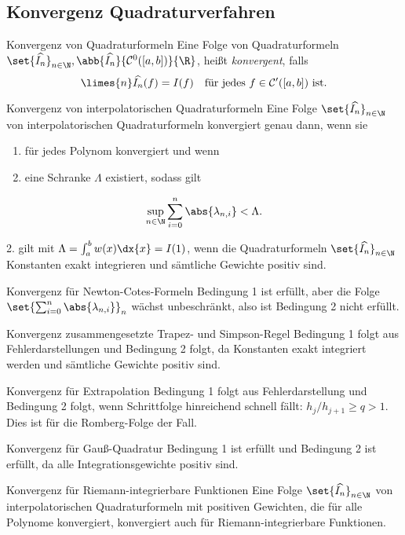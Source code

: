 \subsection*{Konvergenz Quadraturverfahren}

\begin{karte}{Konvergenz von Quadraturformeln}
    Eine Folge von Quadraturformeln \( \set{\widehat{I_n}}_{n\in\N}, \abb{\widehat{I_n}}{\mathcal{C}^0([a,b])}{\R} \), 
    heißt \textit{konvergent}, falls 
    \[ \limes{n} \widehat{I_n}(f) = I(f) \quad \text{für jedes } f \in \mathcal{C^0}([a,b]) \text{ ist}. \]
\end{karte}

\begin{karte}{Konvergenz von interpolatorischen Quadraturformeln}
    Eine Folge \( \set{\widehat{I_n}}_{n\in\N} \) von interpolatorischen Quadraturformeln 
    konvergiert genau dann, wenn sie 
    \begin{enumerate}
        \item für jedes Polynom konvergiert und wenn
        \item eine Schranke \(\Lambda\) existiert, sodass gilt 
    \end{enumerate}
    \[ \sup_{n\in\N} \sum_{i=0}^n \abs{\lambda_{n,i}} < \Lambda. \]

    2. gilt mit \( \Lambda = \int_a^b w(x) \dx{x} = I(1) \), wenn die Quadraturformeln \( \set{\widehat{I_n}}_{n\in\N} \) 
    Konstanten exakt integrieren und sämtliche Gewichte positiv sind.
\end{karte}

\begin{karte}{Konvergenz für Newton-Cotes-Formeln}
    Bedingung 1 ist erfüllt, aber die Folge \( \set{ \sum_{i=0}^n \abs{\lambda_{n,i}} }_n \) 
    wächst unbeschränkt, also ist Bedingung 2 nicht erfüllt.
\end{karte}

\begin{karte}{Konvergenz zusammengesetzte Trapez- und Simpson-Regel}
    Bedingung 1 folgt aus Fehlerdarstellungen und Bedingung 2 folgt, da Konstanten exakt 
    integriert werden und sämtliche Gewichte positiv sind.
\end{karte}

\begin{karte}{Konvergenz für Extrapolation}
    Bedingung 1 folgt aus Fehlerdarstellung und Bedingung 2 folgt, wenn Schrittfolge hinreichend schnell 
    fällt: \( h_j/h_{j+1} \geq q > 1 \). Dies ist für die Romberg-Folge der Fall.
\end{karte}

\begin{karte}{Konvergenz für Gauß-Quadratur}
    Bedingung 1 ist erfüllt und Bedingung 2 ist erfüllt, da alle Integrationsgewichte positiv sind.
\end{karte}

\begin{karte}{Konvergenz für Riemann-integrierbare Funktionen}
    Eine Folge \( \set{\widehat{I_n}}_{n\in\N} \) von interpolatorischen Quadraturformeln mit positiven 
    Gewichten, die für alle Polynome konvergiert, konvergiert auch für Riemann-integrierbare Funktionen.
\end{karte}